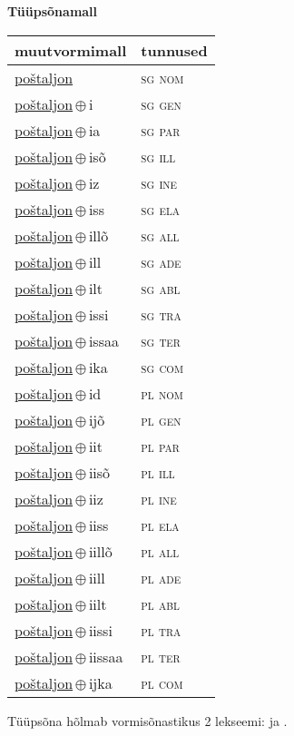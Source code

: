 

\vspace{3.5em}
\noindent \begin{minipage}{\textwidth}
\noindent \textbf{Tüüpsõnamall \,}\\

\begin{sideways}
\begin{tabular}{l l}
muutvormimall & tunnused \\
\hline
\underline{poštaljon} & \textsc{ sg nom } \\
\underline{poštaljon}\,$\oplus$\,i & \textsc{ sg gen } \\
\underline{poštaljon}\,$\oplus$\,ia & \textsc{ sg par } \\
\underline{poštaljon}\,$\oplus$\,isõ & \textsc{ sg ill } \\
\underline{poštaljon}\,$\oplus$\,iz & \textsc{ sg ine } \\
\underline{poštaljon}\,$\oplus$\,iss & \textsc{ sg ela } \\
\underline{poštaljon}\,$\oplus$\,illõ & \textsc{ sg all } \\
\underline{poštaljon}\,$\oplus$\,ill & \textsc{ sg ade } \\
\underline{poštaljon}\,$\oplus$\,ilt & \textsc{ sg abl } \\
\underline{poštaljon}\,$\oplus$\,issi & \textsc{ sg tra } \\
\underline{poštaljon}\,$\oplus$\,issaa & \textsc{ sg ter } \\
\underline{poštaljon}\,$\oplus$\,ika & \textsc{ sg com } \\
\underline{poštaljon}\,$\oplus$\,id & \textsc{ pl nom } \\
\underline{poštaljon}\,$\oplus$\,ijõ & \textsc{ pl gen } \\
\underline{poštaljon}\,$\oplus$\,iit & \textsc{ pl par } \\
\underline{poštaljon}\,$\oplus$\,iisõ & \textsc{ pl ill } \\
\underline{poštaljon}\,$\oplus$\,iiz & \textsc{ pl ine } \\
\underline{poštaljon}\,$\oplus$\,iiss & \textsc{ pl ela } \\
\underline{poštaljon}\,$\oplus$\,iillõ & \textsc{ pl all } \\
\underline{poštaljon}\,$\oplus$\,iill & \textsc{ pl ade } \\
\underline{poštaljon}\,$\oplus$\,iilt & \textsc{ pl abl } \\
\underline{poštaljon}\,$\oplus$\,iissi & \textsc{ pl tra } \\
\underline{poštaljon}\,$\oplus$\,iissaa & \textsc{ pl ter } \\
\underline{poštaljon}\,$\oplus$\,ijka & \textsc{ pl com } \\
\end{tabular}
\end{sideways}
\label{tab:tüüpsõnamall-poštaljon}

\end{minipage}

 
\vspace{1em}
\noindent Tüüpsõna hõlmab vormisõnastikus 2 lekseemi:  ja .
